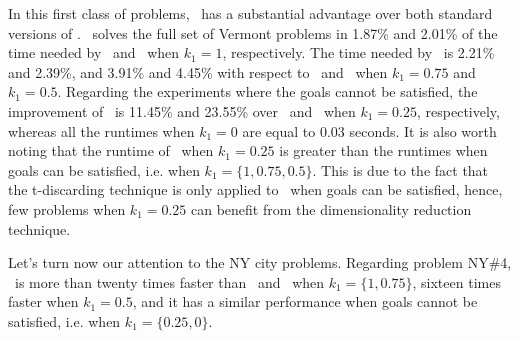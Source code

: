 In this first class of problems, \lexgote \ has a substantial advantage over both standard versions of \lexgo. \lexgote \ solves the full set of Vermont problems in 1.87\% and 2.01\% of the time needed by \lexgolex \ and \lexgolin \ when $k_1 = 1$, respectively. The time needed by \lexgote \ is 2.21\% and 2.39\%, and 3.91\% and 4.45\% with respect to \lexgolex \ and \lexgolin \ when $k_1 = 0.75$ and $k_1 = 0.5$. Regarding the experiments where the goals cannot be satisfied, the improvement of \lexgote \ is 11.45\% and 23.55\% over \lexgolex \ and \lexgolin \ when $k_1 = 0.25$, respectively, whereas all the runtimes when $k_1 = 0$ are equal to 0.03 seconds. It is also worth noting that the runtime of \lexgote \ when $k_1 = 0.25$ is greater than the runtimes when goals can be satisfied, i.e. when $k_1 = \{1, 0.75, 0.5\}$. This is due to the fact that the t-discarding technique is only applied to \lexgo \ when goals can be satisfied, hence, few problems when $k_1 = 0.25$ can benefit from the dimensionality reduction technique.

Let's turn now our attention to the NY city problems. Regarding problem NY\#4, \lexgote \ is more than twenty times faster than \lexgolex \ and \lexgolin \ when $k_1=\{1, 0.75\}$, sixteen times faster when $k_1=0.5$, and it has a similar performance when goals cannot be satisfied, i.e. when $k_1=\{0.25, 0\}$. 

